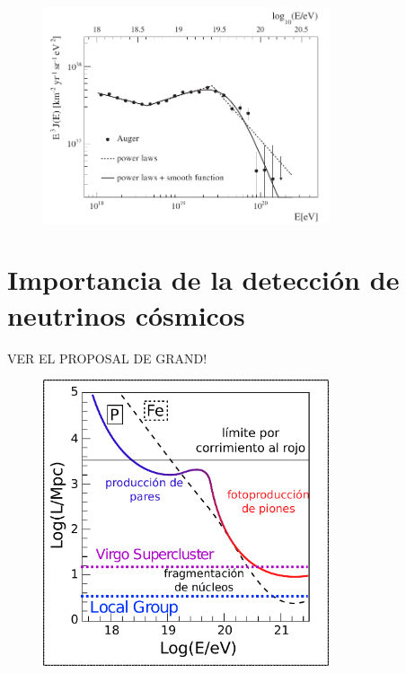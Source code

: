 	\begin{figure}[ht]
		\begin{center}
		\includegraphics[width=0.75\textwidth]{fig/introduccion/spectrum_withGZK}
		\caption{\label{fig:specGZK} }
		\end{center}
	\end{figure}
	
	\section{Importancia de la detecci\'on de neutrinos c\'osmicos}

	VER EL PROPOSAL DE GRAND!
	
\begin{figure}[ht]
	\begin{center}
	\includegraphics[width=0.75\textwidth]{fig/introduccion/proton_propaga_espanol}
	\caption{\label{fig:protProp} }
	\end{center}
\end{figure}


